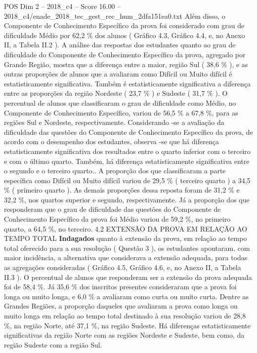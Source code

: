 \begin{textsample}{POS Dim 2 – 2018\_c4 – Score 16.00 – 2018\_c4/enade\_2018\_tec\_gest\_rec\_hum\_2dfa151ea0.txt}
Além disso, o Componente de Conhecimento Específico da prova foi considerado com grau de dificuldade Médio por 62,2 \% dos alunos ( Gráfico 4.3, Gráfico 4.4, e, no Anexo II, a Tabela II.2 ).
A análise das respostas dos estudantes quanto ao grau de dificuldade do Componente de Conhecimento Específico da prova, agregado por Grande Região, mostra que a diferença entre a maior, região Sul ( 38,6 \% ), e as outras proporções de alunos que a avaliaram como Difícil ou Muito difícil é estatisticamente significativa.
Também é estatisticamente significativa a diferença entre as proporções da região Nordeste ( 23,7 \% ) e Sudeste ( 31,7 \% ).
O percentual de alunos que classificaram o grau de dificuldade como Médio, no Componente de Conhecimento Específico, variou de 56,5 \% a 67,8 \%, para as regiões Sul e Nordeste, respectivamente.
Considerando -se a avaliação da dificuldade das questões do Componente de Conhecimento Específico da prova, de acordo com o desempenho dos estudantes, observa -se que há diferença estatisticamente significativa dos resultados entre o quarto inferior com o terceiro e com o último quarto.
Também, há diferença estatisticamente significativa entre o segundo e o terceiro quarto..
A proporção dos que classificaram a parte específica como Difícil ou Muito difícil variou de 29,5 \% ( terceiro quarto ) a 34,5 \% ( primeiro quarto ).
As demais proporções dessa reposta foram de 31,2 \% e 32,2 \%, nos quartos superior e segundo, respectivamente.
Já a proporção dos que responderam que o grau de dificuldade das questões do Componente de Conhecimento Específico da prova foi Médio variou de 59,2 \%, no primeiro quarto, a 64,5 \%, no terceiro. 4.2 EXTENSÃO DA PROVA EM RELAÇÃO AO TEMPO TOTAL \textbf{Indagados} quanto à extensão da prova, em relação ao tempo total oferecido para a sua resolução ( Questão 3 ), os estudantes apontaram, com maior incidência, a alternativa que considerava a extensão adequada, para todas as agregações consideradas ( Gráfico 4.5, Gráfico 4.6, e, no Anexo II, a Tabela II.3 ).
O percentual de alunos que responderam ser a extensão da prova adequada foi de 58,4 \%.
Já 35,6 \% dos inscritos presentes consideraram que a prova foi longa ou muito longa, e 6,0 \% a avaliaram como curta ou muito curta.
Dentre as Grandes Regiões, a proporção daqueles que avaliaram a prova como longa ou muito longa em relação ao tempo total destinado à sua resolução variou de 28,8 \%, na região Norte, até 37,1 \%, na região Sudeste.
Há diferenças estatisticamente significativas da região Norte com as regiões Nordeste e Sudeste, bem como, da região Sudeste com a região Sul.

\end{textsample}

